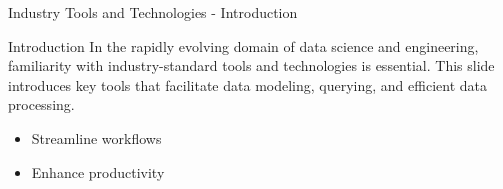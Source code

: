 \documentclass[aspectratio=169]{beamer}
\begin{document}
\begin{frame}[fragile]{Industry Tools and Technologies - Introduction}
  \begin{block}{Introduction}
    In the rapidly evolving domain of data science and engineering, familiarity with industry-standard tools and technologies is essential. This slide introduces key tools that facilitate data modeling, querying, and efficient data processing.
  \end{block}

  \begin{itemize}
    \item Streamline workflows
    \item Enhance productivity
  \end{itemize}
\end{frame}
\end{document}

